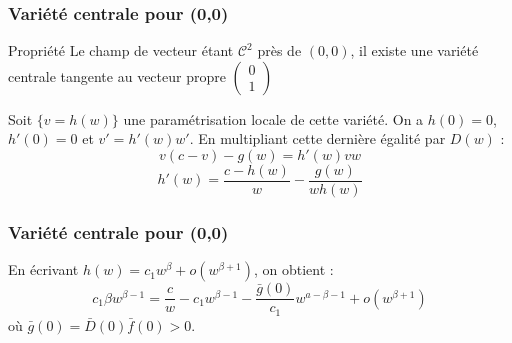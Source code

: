 \documentclass[handout]{beamer}
\begin{document}
\begin{frame}
	\frametitle{Variété centrale pour (0,0)}
\begin{block}{Propriété}
Le champ de vecteur étant $\mathcal{C}^2$ près de $(0,0)$, il existe une variété centrale tangente au vecteur propre $\begin{pmatrix} 0\\ 1 \end{pmatrix}$
\end{block}

Soit $\{v=h(w)\}$ une paramétrisation locale de cette variété. On a $h(0)=0$, $h'(0)=0$ et $v'=h'(w)w'$. En multipliant cette dernière égalité par $D(w)$ : 
\[v(c-v)-g(w)=h'(w)vw\]
\[h'(w)=\frac{c-h(w)}{w}-\frac{g(w)}{wh(w)}\]
\end{frame}

\begin{frame}
	\frametitle{Variété centrale pour (0,0)}
En écrivant $h(w)=c_1 w^\beta+o(w^{\beta+1})$, on obtient :
\[c_1\beta w^{\beta-1}=\frac{c}{w}-c_1w^{\beta-1}-\frac{\bar{g}(0)}{c_1}w^{a-\beta-1}+o(w^{\beta+1})\]
où $\bar{g}(0)=\bar{D}(0)\bar{f}(0)>0$.
\end{frame}
\end{document}
